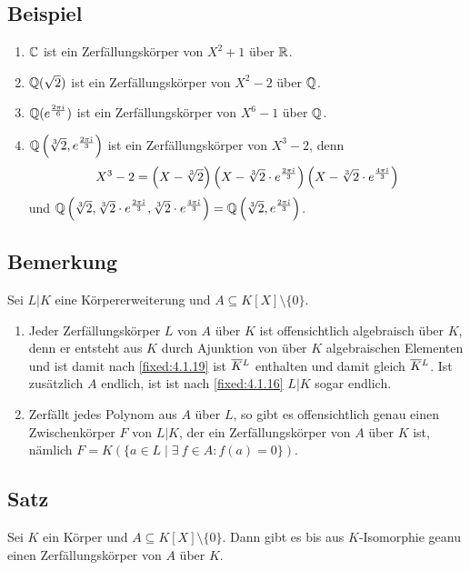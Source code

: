 \subsection{Beispiel}

\begin{enumerate}[label=(\alph*)]
	\item
		$\mathbb C$ ist ein Zerfällungskörper von $X^2+1$ über $\mathbb R$.
		
	\item
		$\mathbb Q(\sqrt 2)$ ist ein Zerfällungskörper von $X^2-2$ über $\mathbb Q$.
		
	\item
		$\mathbb Q(e^ {\frac{2 \pi i}{6}})$ ist ein Zerfällungskörper von $X^ 6-1$ über $\mathbb Q$.
		
	\item
		$\mathbb Q\left(\sqrt[3]{2}, e^ {\frac{2 \pi \mathring\imath}{3}}\right)$ ist ein Zerfällungskörper von $X^3 -2$, denn
		$$X^ 3-2 = \left(X-\sqrt[3]{2}\right)\left(X-\sqrt[3]{2} \cdot e^{\frac{2 \pi \mathring\imath}{3}}\right) \left(X-\sqrt[3]{2} \cdot e^{\frac{4 \pi \mathring\imath}{3}}\right)$$
		und $\mathbb Q\left(\sqrt[3]{2}, \sqrt[3]{2} \cdot e^{\frac{2 \pi \mathring\imath}{3}}, \sqrt[3]{2} \cdot e^{\frac{4 \pi \mathring\imath}{3}}\right) = \mathbb Q\left(\sqrt[3]{2}, e^{\frac{2 \pi \mathring\imath}{3}}\right)$.
\end{enumerate}

\subsection{Bemerkung} Sei $L|K$ eine Körpererweiterung und $A \subseteq K[X] \setminus \{0\}$.
\begin{enumerate}[label=(\alph*)]
	\item
		Jeder Zerfällungskörper $L$ von $A$ über $K$ ist offensichtlich algebraisch über $K$, denn er entsteht aus $K$ durch Ajunktion von über $K$ algebraischen Elementen und ist damit nach \ref{fixed:4.1.19} ist $\barsmash KL$ enthalten und damit gleich $\barsmash KL$. Ist zusätzlich $A$ endlich, ist ist nach \ref{fixed:4.1.16} $L|K$ sogar endlich.
		
	\item
		Zerfällt jedes Polynom aus $A$ über $L$, so gibt es offensichtlich genau einen Zwischenkörper $F$ von $L|K$, der ein Zerfällungskörper von $A$ über $K$ ist, nämlich $F = K(\{a \in L \mid \exists~f \in A : f(a)=0\})$.
\end{enumerate}

\subsection{Satz} Sei $K$ ein Körper und $A \subseteq K[X] \setminus \{0\}$. Dann gibt es bis aus $K$-Isomorphie geanu einen Zerfällungskörper von $A$ über $K$.

